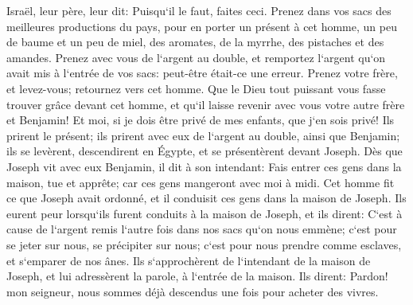 \verse Israël, leur père, leur dit: Puisqu`il le faut, faites ceci. Prenez dans vos sacs des meilleures productions du pays, pour en porter un présent à cet homme, un peu de baume et un peu de miel, des aromates, de la myrrhe, des pistaches et des amandes. 
\verse Prenez avec vous de l`argent au double, et remportez l`argent qu`on avait mis à l`entrée de vos sacs: peut-être était-ce une erreur. 
\verse Prenez votre frère, et levez-vous; retournez vers cet homme. 
\verse Que le Dieu tout puissant vous fasse trouver grâce devant cet homme, et qu`il laisse revenir avec vous votre autre frère et Benjamin! Et moi, si je dois être privé de mes enfants, que j`en sois privé! 
\verse Ils prirent le présent; ils prirent avec eux de l`argent au double, ainsi que Benjamin; ils se levèrent, descendirent en Égypte, et se présentèrent devant Joseph. 
\verse Dès que Joseph vit avec eux Benjamin, il dit à son intendant: Fais entrer ces gens dans la maison, tue et apprête; car ces gens mangeront avec moi à midi. 
\verse Cet homme fit ce que Joseph avait ordonné, et il conduisit ces gens dans la maison de Joseph. 
\verse Ils eurent peur lorsqu`ils furent conduits à la maison de Joseph, et ils dirent: C`est à cause de l`argent remis l`autre fois dans nos sacs qu`on nous emmène; c`est pour se jeter sur nous, se précipiter sur nous; c`est pour nous prendre comme esclaves, et s`emparer de nos ânes. 
\verse Ils s`approchèrent de l`intendant de la maison de Joseph, et lui adressèrent la parole, à l`entrée de la maison. 
\verse Ils dirent: Pardon! mon seigneur, nous sommes déjà descendus une fois pour acheter des vivres. 
